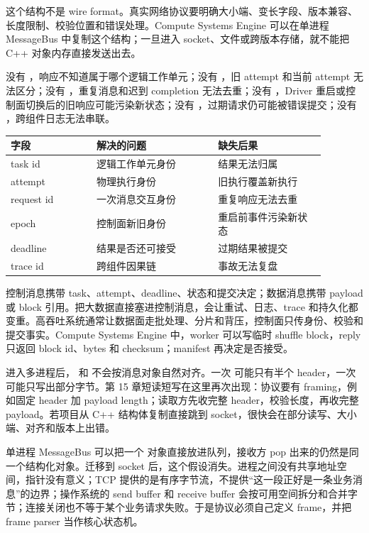 这个结构不是 wire format。真实网络协议要明确大小端、变长字段、版本兼容、长度限制、校验位置和错误处理。Compute Systems Engine 可以在单进程 MessageBus 中复制这个结构；一旦进入 socket、文件或跨版本存储，就不能把 C++ 对象内存直接发送出去。

没有 ，响应不知道属于哪个逻辑工作单元；没有 ，旧 attempt 和当前 attempt 无法区分；没有 ，重复消息和迟到 completion 无法去重；没有 ，Driver 重启或控制面切换后的旧响应可能污染新状态；没有 ，过期请求仍可能被错误提交；没有 ，跨组件日志无法串联。

\begin{center}
\begin{tabular}{p{0.24\linewidth}p{0.34\linewidth}p{0.30\linewidth}}
\toprule
字段 & 解决的问题 & 缺失后果 \\
\midrule
task id & 逻辑工作单元身份 & 结果无法归属 \\
attempt & 物理执行身份 & 旧执行覆盖新执行 \\
request id & 一次消息交互身份 & 重复响应无法去重 \\
epoch & 控制面新旧身份 & 重启前事件污染新状态 \\
deadline & 结果是否还可接受 & 过期结果被提交 \\
trace id & 跨组件因果链 & 事故无法复盘 \\
\bottomrule
\end{tabular}
\end{center}

控制消息携带 task、attempt、deadline、状态和提交决定；数据消息携带 payload 或 block 引用。把大数据直接塞进控制消息，会让重试、日志、trace 和持久化都变重。高吞吐系统通常让数据面走批处理、分片和背压，控制面只传身份、校验和提交事实。Compute Systems Engine 中，worker 可以写临时 shuffle block，reply 只返回 block id、bytes 和 checksum；manifest 再决定是否接受。

进入多进程后， 和  不会按消息对象自然对齐。一次  可能只有半个 header，一次  可能只写出部分字节。第 15 章短读短写在这里再次出现：协议要有 framing，例如固定 header 加 payload length；读取方先收完整 header，校验长度，再收完整 payload。若项目从 C++ 结构体复制直接跳到 socket，很快会在部分读写、大小端、对齐和版本上出错。

单进程 MessageBus 可以把一个  对象直接放进队列，接收方 pop 出来的仍然是同一个结构化对象。迁移到 socket 后，这个假设消失。进程之间没有共享地址空间，指针没有意义；TCP 提供的是有序字节流，不提供“这一段正好是一条业务消息”的边界；操作系统的 send buffer 和 receive buffer 会按可用空间拆分和合并字节；连接关闭也不等于某个业务请求失败。于是协议必须自己定义 frame，并把 frame parser 当作核心状态机。

